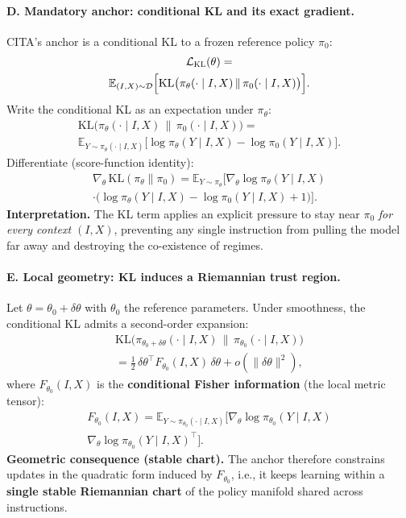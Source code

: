 \vspace{-0.35em}
\paragraph{\textbf{D. Mandatory anchor: conditional KL and its exact gradient.}}
CITA’s anchor is a conditional KL to a frozen reference policy $\pi_0$:
\begin{multline*}
\mathcal{L}_{\textsc{KL}}(\theta)
=\\
\mathbb{E}_{(I,X)\sim\mathcal{D}}
\Big[
\mathrm{KL}\big(\pi_\theta(\cdot\mid I,X)\,\|\,\pi_0(\cdot\mid I,X)\big)
\Big].
\end{multline*}
Write the conditional KL as an expectation under $\pi_\theta$:
{\small
\begin{multline*}
\mathrm{KL}\big(\pi_\theta(\cdot\mid I,X)\,\|\,\pi_0(\cdot\mid I,X)\big)
=\\
\mathbb{E}_{Y\sim\pi_\theta(\cdot\mid I,X)}
\Big[
\log\pi_\theta(Y\mid I,X)-\log\pi_0(Y\mid I,X)
\Big].
\end{multline*}
}
Differentiate (score-function identity):
\begin{multline*}
\nabla_\theta\,\mathrm{KL}(\pi_\theta\|\pi_0)
=
\mathbb{E}_{Y\sim\pi_\theta}
\Big[
\nabla_\theta\log\pi_\theta(Y\mid I,X)\\
\cdot\big(\log\pi_\theta(Y\mid I,X)-\log\pi_0(Y\mid I,X)+1\big)
\Big].
\end{multline*}
\textbf{Interpretation.} The KL term applies an explicit pressure to stay near $\pi_0$ \emph{for every context $(I,X)$}, preventing any single instruction from pulling the model far away and destroying the co-existence of regimes.

\vspace{-0.35em}
\paragraph{\textbf{E. Local geometry: KL induces a Riemannian trust region.}}
Let $\theta=\theta_0+\delta\theta$ with $\theta_0$ the reference parameters.
Under smoothness, the conditional KL admits a second-order expansion:
\begin{multline*}
\mathrm{KL}\big(\pi_{\theta_0+\delta\theta}(\cdot\mid I,X)\,\|\,\pi_{\theta_0}(\cdot\mid I,X)\big)\\
=
\tfrac{1}{2}\,\delta\theta^\top F_{\theta_0}(I,X)\,\delta\theta
+ o(\|\delta\theta\|^2),
\end{multline*}
where $F_{\theta_0}(I,X)$ is the \textbf{conditional Fisher information} (the local metric tensor):
\begin{multline*}
F_{\theta_0}(I,X)
=
\mathbb{E}_{Y\sim\pi_{\theta_0}(\cdot\mid I,X)}
\Big[
\nabla_\theta\log\pi_{\theta_0}(Y\mid I,X)\\
\nabla_\theta\log\pi_{\theta_0}(Y\mid I,X)^\top
\Big].
\end{multline*}
\textbf{Geometric consequence (stable chart).} The anchor therefore constrains updates in the quadratic form induced by $F_{\theta_0}$, i.e., it keeps learning within a \textbf{single stable Riemannian chart} of the policy manifold shared across instructions.

